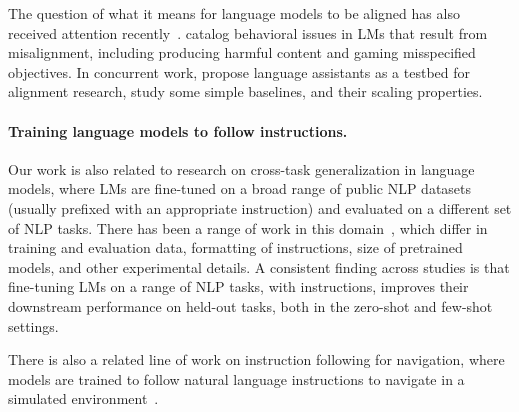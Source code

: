 \documentclass{article}
\begin{document}
The question of what it means for language models to be aligned has also received attention recently~\citep{gabriel2020artificial}. \citet{kenton2021alignment} catalog behavioral issues in LMs that result from misalignment, including producing harmful content and gaming misspecified objectives. In concurrent work, \citet{askell2021general} propose language assistants as a testbed for alignment research, study some simple baselines, and their scaling properties.

\paragraph{Training language models to follow instructions.} Our work is also related to research on cross-task generalization in language models, where LMs are fine-tuned on a broad range of public NLP datasets (usually prefixed with an appropriate instruction) and evaluated on a different set of NLP tasks. There has been a range of work in this domain~\citep{yi2019towards,mishra2021cross,wei2021finetuned,khashabi2020unifiedqa,sanh2021multitask,aribandi2021ext5}, which differ in training and evaluation data, formatting of instructions, size of pretrained models, and other experimental details. A consistent finding across studies is that fine-tuning LMs on a range of NLP tasks, with instructions, improves their downstream performance on held-out tasks, both in the zero-shot and few-shot settings. 

There is also a related line of work on instruction following for navigation, where models are trained to follow natural language instructions to navigate in a simulated environment~\citep{bahdanau2018learning,abramson2020imitating,zhao2021evaluation}.
\end{document}

